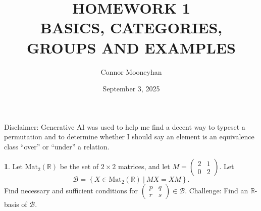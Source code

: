 \documentclass[12pt]{article}
\title{HOMEWORK 1\\BASICS, CATEGORIES, GROUPS AND EXAMPLES}
\author{Connor Mooneyhan}
\date{September 3, 2025}
\theoremstyle{definition}
\newtheorem{ex}{}
\begin{document}
\maketitle

Disclaimer: Generative AI was used to help me find a decent way to typeset a permutation and to determine whether I should say an element is an equivalence class ``over'' or ``under'' a relation.

\begin{ex}
	Let $\mathrm{Mat}_2(\mathbb{R})$ be the set of $2 \times 2$ matrices, and let $M = \begin{pmatrix}2 & 1 \\ 0 & 2\end{pmatrix}$.
	Let \begin{equation*}
		\mathcal{B} = \left\lbrace X \in \mathrm{Mat}_2(\mathbb{R}) \ |\  MX = XM \right\rbrace.
	\end{equation*}
	Find necessary and sufficient conditions for $\begin{pmatrix}p & q \\ r & s\end{pmatrix} \in \mathcal{B}$.
	Challenge: Find an $\mathbb{R}$-basis of $\mathcal{B}$.
\end{ex}
\end{document}
